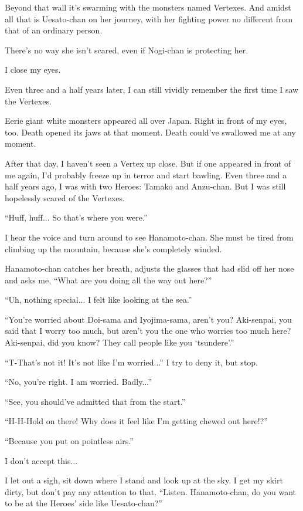 Beyond that wall it's swarming with the monsters named Vertexes. And amidst all that is Uesato-chan on her journey, with her fighting power no different from that of an ordinary person.

There's no way she isn't scared, even if Nogi-chan is protecting her.

I close my eyes.

Even three and a half years later, I can still vividly remember the first time I saw the Vertexes.

Eerie giant white monsters appeared all over Japan. Right in front of my eyes, too. Death opened its jaws at that moment. Death could've swallowed me at any moment.

After that day, I haven't seen a Vertex up close. But if one appeared in front of me again, I'd probably freeze up in terror and start bawling. Even three and a half years ago, I was with two Heroes: Tamako and Anzu-chan. But I was still hopelessly scared of the Vertexes.

``Huff, huff... So that's where you were.''

I hear the voice and turn around to see Hanamoto-chan. She must be tired from climbing up the mountain, because she's completely winded.

Hanamoto-chan catches her breath, adjusts the glasses that had slid off her nose and asks me, ``What are you doing all the way out here?''

``Uh, nothing special... I felt like looking at the sea.''

``You're worried about Doi-sama and Iyojima-sama, aren't you? Aki-senpai, you said that I worry too much, but aren't you the one who worries too much here? Aki-senpai, did you know? They call people like you `tsundere'.''

``T-That's not it! It's not like I'm worried...'' I try to deny it, but stop.

``No, you're right. I am worried. Badly...''

``See, you should've admitted that from the start.''

``H-H-Hold on there! Why does it feel like I'm getting chewed out here!?''

``Because you put on pointless airs.''

I don't accept this...

I let out a sigh, sit down where I stand and look up at the sky. I get my skirt dirty, but don't pay any attention to that.  ``Listen. Hanamoto-chan, do you want to be at the Heroes' side like Uesato-chan?''

